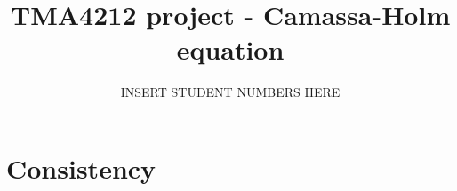 \documentclass{article}
\title{TMA4212 project - Camassa-Holm equation}
\author{INSERT STUDENT NUMBERS HERE}
\begin{document}
\maketitle

\section*{Consistency}

\end{document}
